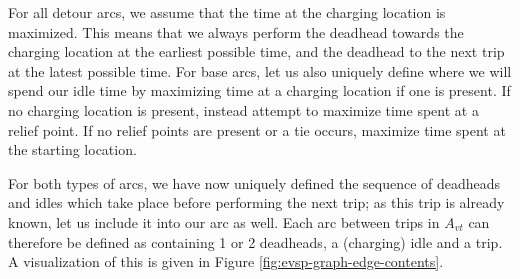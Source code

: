 \documentclass[]{article}
\begin{document}
For all detour arcs, we assume that the time at the charging location is maximized. This means that we always perform the deadhead towards the charging location at the earliest possible time, and the deadhead to the next trip at the latest possible time. For base arcs, let us also uniquely define where we will spend our idle time by maximizing time at a charging location if one is present. If no charging location is present, instead attempt to maximize time spent at a relief point. If no relief points are present or a tie occurs, maximize time spent at the starting location. 

For both types of arcs, we have now uniquely defined the sequence of deadheads and idles which take place before performing the next trip; as this trip is already known, let us include it into our arc as well. Each arc between trips in $A_{vt}$ can therefore be defined as containing 1 or 2 deadheads, a (charging) idle and a trip. A visualization of this is given in Figure \ref{fig:evsp-graph-edge-contents}. 
\end{document}
